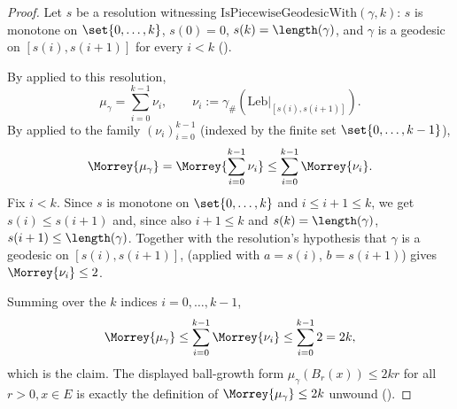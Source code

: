 \begin{proof}
  Let $s$ be a resolution witnessing $\mathrm{IsPiecewiseGeodesicWith}(\gamma,k)$: $s$ is monotone
  on $\set{0,\dots,k}$, $s(0)=0$, $s(k)=\length(\gamma)$, and $\gamma$ is a geodesic on
  $[s(i),s(i+1)]$ for every $i<k$ ().

  By  applied to this resolution,
  \[
    \mu_\gamma = \sum_{i=0}^{k-1} \nu_i
    , \qquad \nu_i := \gamma_\#\!\left(\mathrm{Leb}|_{[s(i),s(i+1)]}\right)
    .
  \]
  By  applied to the family $(\nu_i)_{i=0}^{k-1}$ (indexed by the finite
  set $\set{0,\dots,k-1}$),
  \[
    \Morrey{\mu_\gamma} = \Morrey{\sum_{i=0}^{k-1}\nu_i} \le \sum_{i=0}^{k-1} \Morrey{\nu_i}
    .
  \]
  Fix $i < k$. Since $s$ is monotone on $\set{0,\dots,k}$ and $i \le i+1 \le k$, we get
  $s(i) \le s(i+1)$ and, since also $i+1 \le k$ and $s(k) = \length(\gamma)$, $s(i+1) \le
  \length(\gamma)$. Together with the resolution's hypothesis that $\gamma$ is a geodesic on
  $[s(i),s(i+1)]$,  (applied with $a=s(i)$, $b=s(i+1)$) gives
  $\Morrey{\nu_i} \le 2$.

  Summing over the $k$ indices $i=0,\dots,k-1$,
  \[
    \Morrey{\mu_\gamma} \le \sum_{i=0}^{k-1} \Morrey{\nu_i} \le \sum_{i=0}^{k-1} 2 = 2k
    ,
  \]
  which is the claim. The displayed ball-growth form $\mu_\gamma(B_r(x)) \le 2kr$ for all $r>0,
  x\in E$ is exactly the definition of $\Morrey{\mu_\gamma} \le 2k$ unwound
  ().
\end{proof}
